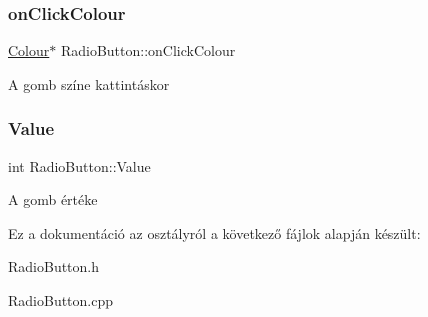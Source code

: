 \subsubsection{\texorpdfstring{on\+Click\+Colour}{onClickColour}}
{\footnotesize\ttfamily \hyperlink{class_colour}{Colour}$\ast$ Radio\+Button\+::on\+Click\+Colour\hspace{0.3cm}{\ttfamily [private]}}

A gomb színe kattintáskor \mbox{\label{class_radio_button_a98ca476a4f3f93bdadd03c495b1457c9}} 
\subsubsection{\texorpdfstring{Value}{Value}}
{\footnotesize\ttfamily int Radio\+Button\+::\+Value\hspace{0.3cm}{\ttfamily [private]}}

A gomb értéke 

Ez a dokumentáció az osztályról a következő fájlok alapján készült\+:\begin{DoxyCompactItemize}
\item 
Radio\+Button.\+h\item 
Radio\+Button.\+cpp\end{DoxyCompactItemize}
